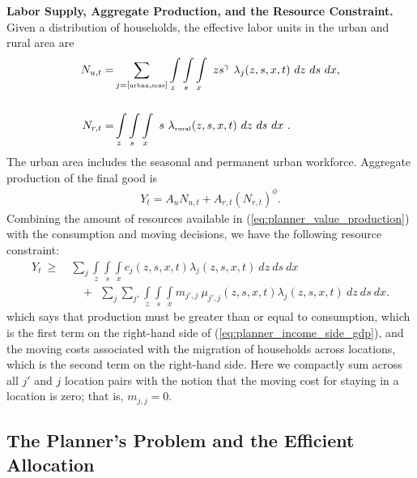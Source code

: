 \documentclass[12pt,pdftex]{article}
\begin{document}
\textbf{Labor Supply, Aggregate Production, and the Resource Constraint.} Given a distribution of households, the effective labor units in the urban and rural area are
\begin{align}
N_{u,t} =& \sum_{j = [\mbox{\tiny urban}, \mbox{\tiny seas}]}\int\limits_{z} \int\limits_{s} \int\limits_{x} \  z s^{\gamma} \ \lambda_j(z, s, x, t) \ dz \ ds \ dx, \nonumber
\\
\nonumber \\
N_{r,t} =& \int\limits_{z} \int\limits_{s} \int\limits_{x} \ s \ \lambda_{\mbox{\tiny rural}}(z, s, x, t)\ dz \ ds \ dx \ .
\label{eq:planner_labor_supply}
\end{align}
The urban area includes the seasonal and permanent urban workforce. Aggregate production of the final good is
\begin{align}
Y_t = A_u N_{u,t} + A_{r,t} \left(N_{r,t} \right)^{\phi}.
\label{eq:planner_value_production}
\end{align}
Combining the amount of resources available in (\ref{eq:planner_value_production}) with the consumption and moving decisions, we have the following resource constraint:
\begin{align}
Y_t\  \geq \ & \sum_{j} \int\limits_{z} \int\limits_{s} \int\limits_{x} c_{j}(z, s, x, t) \lambda_{j}(z, s, x, t) \ dz \ ds \ dx  \nonumber \\
& \ \ \ \ +  \ \  \sum_{j}\sum_{j'} \int\limits_{z} \int\limits_{s} \int\limits_{x}  m_{j',j} \ \mu_{j',j}(z,s, x, t) \lambda_{j}(z, s, x, t) \ dz \ ds \ dx.
\label{eq:planner_income_side_gdp}
\end{align}
which says that production must be greater than or equal to consumption, which is the first term on the right-hand side of (\ref{eq:planner_income_side_gdp}), and the moving costs associated with the migration of households across locations, which is the second term on the right-hand side. Here we compactly sum across all $j'$ and $j$ location pairs with the notion that the moving cost for staying in a location is zero; that is, $m_{j,j} = 0$.

\subsection{The Planner's Problem and the Efficient Allocation}
\end{document}
